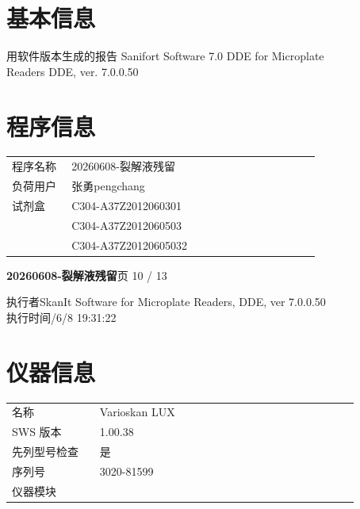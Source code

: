 \documentclass[UTF8,10pt,a4paper,fontset=fandol]{ctexart}
\newcommand{\fieldvalue}[1]{#1}
\begin{document}
\bigskip

\section*{基本信息}

\begin{center}
用软件版本生成的报告 \quad Sanifort Software 7.0 DDE for Microplate\\
Readers DDE, ver. 7.0.0.50
\end{center}

\section*{程序信息}

\begin{tabular}{p{0.18\linewidth}p{0.75\linewidth}}
程序名称 &
\fieldvalue{20260608-裂解液残留}\\
负荷用户 &
\fieldvalue{张勇pengchang}\\
试剂盒 &
\fieldvalue{C304-A37Z2012060301}\\
&
\fieldvalue{C304-A37Z2012060503}\\
&
\fieldvalue{C304-A37Z20120605032}
\end{tabular}


\newpage

\begin{center}
\textbf{20260608-裂解液残留}\hfill 页 10 / 13
\end{center}

\noindent
执行者\quad SkanIt Software for Microplate Readers, DDE, ver 7.0.0.50\\
执行时间/6/8 19:31:22

\section*{仪器信息}

\begin{tabular}{@{}p{0.22\linewidth}p{0.65\linewidth}@{}}
名称 & Varioskan LUX\\
SWS 版本 & 1.00.38\\
先列型号检查 & 是\\
序列号 & 3020-81599\\
仪器模块 & \\
\end{tabular}
\end{document}
